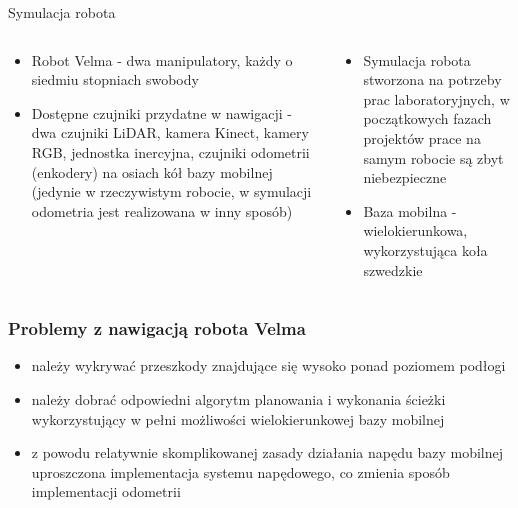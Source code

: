 
\begin{frame}{Symulacja robota}
	\begin{columns}
		\begin{column}{0.5\textwidth}
			\begin{itemize}
				\item Robot Velma - dwa manipulatory, każdy o siedmiu stopniach swobody
				
				
				\item Dostępne czujniki przydatne w nawigacji - dwa czujniki LiDAR, kamera Kinect, kamery RGB, jednostka inercyjna, czujniki odometrii (enkodery) na osiach kół bazy mobilnej (jedynie w rzeczywistym robocie, w symulacji odometria jest realizowana w inny sposób)
				
			\end{itemize}
		\end{column}
		\begin{column}{0.5\textwidth}
			\begin{itemize}
				
				\item Symulacja robota stworzona na potrzeby prac laboratoryjnych, w początkowych fazach projektów prace na samym robocie są zbyt niebezpieczne
				\item Baza mobilna - wielokierunkowa, wykorzystująca koła szwedzkie
			\end{itemize}
		\end{column}		
	\end{columns}
	
\end{frame}

\begin{frame}
\frametitle{Problemy z nawigacją robota Velma}
	\begin{itemize}
		\item należy wykrywać przeszkody znajdujące się wysoko ponad poziomem podłogi
		\item należy dobrać odpowiedni algorytm planowania i wykonania ścieżki wykorzystujący w pełni możliwości wielokierunkowej bazy mobilnej
		\item z powodu relatywnie skomplikowanej zasady działania napędu bazy mobilnej uproszczona implementacja systemu napędowego, co zmienia sposób implementacji odometrii
	\end{itemize}
\end{frame}

